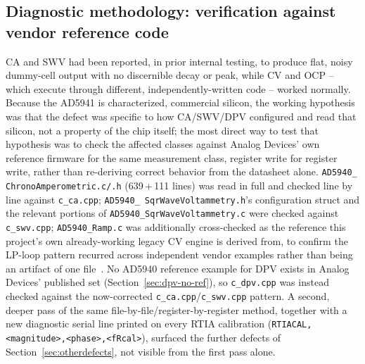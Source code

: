 \subsection{Diagnostic methodology: verification against vendor reference code}
\label{sec:diagmethod}
CA and SWV had been reported, in prior internal testing, to produce flat,
noisy dummy-cell output with no discernible decay or peak, while CV and OCP
-- which execute through different, independently-written code -- worked
normally. Because the AD5941 is characterized, commercial silicon, the
working hypothesis was that the defect was specific to how CA/SWV/DPV
configured and read that silicon, not a property of the chip itself; the
most direct way to test that hypothesis was to check the affected classes
against Analog Devices' own reference firmware for the same measurement
class, register write for register write, rather than re-deriving correct
behavior from the datasheet alone. \texttt{AD5940\_\allowbreak
ChronoAmperometric.c/.h} (639\,+\,111 lines) was read in full and checked
line by line against \texttt{c\_ca.cpp}; \texttt{AD5940\_\allowbreak
SqrWaveVoltammetry.h}'s configuration struct and the relevant portions of
\texttt{AD5940\_\allowbreak SqrWaveVoltammetry.c} were checked against
\texttt{c\_swv.cpp}; \texttt{AD5940\_Ramp.c} was
additionally cross-checked as the reference this project's own
already-working legacy CV engine is derived from, to confirm the LP-loop
pattern recurred across independent vendor examples rather than being an
artifact of one file~\cite{ad5940_examples_github}. No AD5940 reference
example for DPV exists in Analog Devices' published set (Section~\ref{sec:dpv-no-ref}),
so \texttt{c\_dpv.cpp} was instead checked against the now-corrected
\texttt{c\_ca.cpp}/\texttt{c\_swv.cpp} pattern. A second, deeper pass of
the same file-by-file/register-by-register method, together with a new
diagnostic serial line printed on every RTIA calibration
(\texttt{RTIACAL,\allowbreak<magnitude>,\allowbreak<phase>,\allowbreak<fRcal>}), surfaced the
further defects of Section~\ref{sec:otherdefects}, not visible from the
first pass alone.

